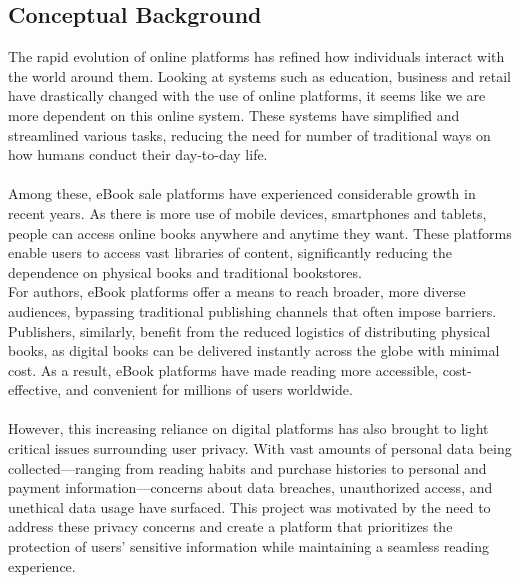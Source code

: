 \documentclass[12pt]{article}
\begin{document}
\subsection{Conceptual Background}
The rapid evolution of online platforms has refined how individuals interact with the world around them. Looking at systems such as education, business and retail have drastically changed with the use of online platforms, it seems like we are more dependent on this online system. These systems have simplified and streamlined various tasks, reducing the need for number of traditional ways on how humans conduct their day-to-day life.~\cite{harman2018}\\\\
Among these, eBook sale platforms have experienced considerable growth in recent years. As there is more use of mobile devices, smartphones and tablets, people can access online books anywhere and anytime they want. These platforms enable users to access vast libraries of content, significantly reducing the dependence on physical books and traditional bookstores.~\cite{urbanwriters2022}\\

For authors, eBook platforms offer a means to reach broader, more diverse audiences, bypassing traditional publishing channels that often impose barriers. Publishers, similarly, benefit from the reduced logistics of distributing physical books, as 
digital books can be delivered instantly across the globe with minimal cost. As a
 result, eBook platforms have made reading more accessible, cost-effective, and convenient for millions of users worldwide.
~\cite{urbanwriters2022}\\\\
However, this increasing reliance on digital platforms has also brought to light critical issues surrounding user privacy. With vast amounts of personal data being collected—ranging from reading habits and purchase histories to personal and payment information—concerns about data breaches, unauthorized access, and unethical data usage have surfaced. This project was motivated by the need to address these privacy concerns and create a platform that prioritizes the protection of users’ sensitive information while maintaining a seamless reading experience.
\end{document}
